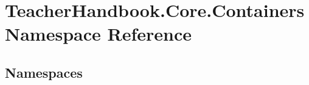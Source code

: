 \hypertarget{namespace_teacher_handbook_1_1_core_1_1_containers}{}\section{Teacher\+Handbook.\+Core.\+Containers Namespace Reference}
\label{namespace_teacher_handbook_1_1_core_1_1_containers}
\subsection*{Namespaces}
\begin{DoxyCompactItemize}
\end{DoxyCompactItemize}
